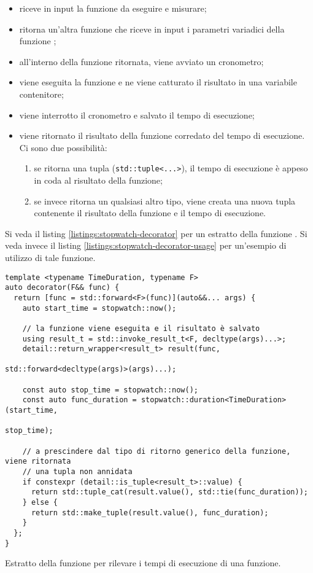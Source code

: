 \begin{itemize}
    \item riceve in input la funzione  da eseguire e
      misurare;
    \item ritorna un'altra funzione che riceve in input i parametri
      variadici  della funzione ;
    \item all'interno della funzione ritornata, viene avviato un
      cronometro;
    \item viene eseguita la funzione e ne viene catturato il risultato
      in una variabile contenitore;
    \item viene interrotto il cronometro e salvato il tempo di
      esecuzione;
    \item viene ritornato il risultato della funzione corredato del
      tempo di esecuzione. Ci sono due possibilità:
    \begin{enumerate}
        \item se  ritorna una tupla
          (\texttt{std::tuple<...>}), il tempo di esecuzione
          è appeso in coda al risultato della funzione;
        \item se invece  ritorna un
          qualsiasi altro tipo, viene creata una nuova tupla
          contenente il risultato della funzione e il tempo di
          esecuzione.
    \end{enumerate}
\end{itemize}

Si veda il listing \ref{listings:stopwatch-decorator} per un estratto
della funzione .  Si veda invece il listing
\ref{listings:stopwatch-decorator-usage} per un'esempio di utilizzo di
tale funzione.

\begin{listing}[!ht]
\begin{verbatim}
template <typename TimeDuration, typename F>
auto decorator(F&& func) {
  return [func = std::forward<F>(func)](auto&&... args) {
    auto start_time = stopwatch::now();
    
    // la funzione viene eseguita e il risultato è salvato
    using result_t = std::invoke_result_t<F, decltype(args)...>;
    detail::return_wrapper<result_t> result(func,
                                            std::forward<decltype(args)>(args)...);

    const auto stop_time = stopwatch::now();
    const auto func_duration = stopwatch::duration<TimeDuration>(start_time,
                                                                 stop_time);

    // a prescindere dal tipo di ritorno generico della funzione, viene ritornata
    // una tupla non annidata
    if constexpr (detail::is_tuple<result_t>::value) {
      return std::tuple_cat(result.value(), std::tie(func_duration));
    } else {
      return std::make_tuple(result.value(), func_duration);
    }
  };
}
\end{verbatim}
\caption{Estratto della funzione  per rilevare i
  tempi di esecuzione di una funzione.}
\label{listings:stopwatch-decorator}
\end{listing}


